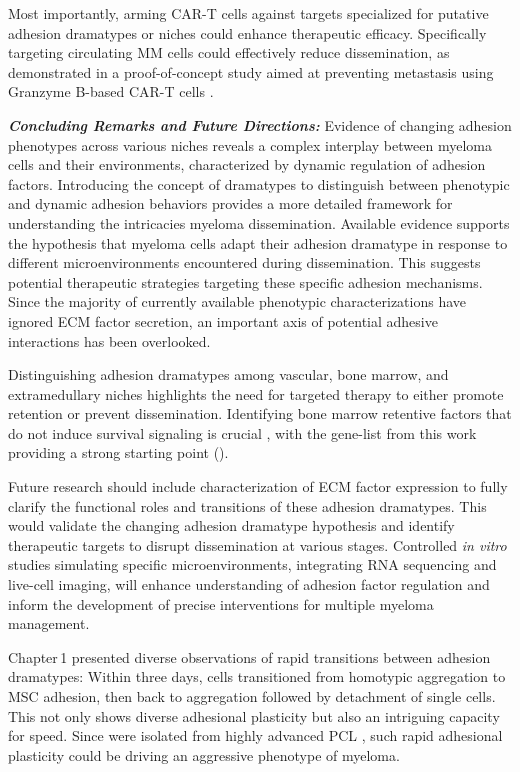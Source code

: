 Most importantly, arming CAR-T cells against targets specialized for putative
adhesion dramatypes or niches could enhance therapeutic efficacy. Specifically
targeting circulating MM cells could effectively reduce dissemination, as
demonstrated in a proof-of-concept study aimed at preventing metastasis using
Granzyme B-based CAR-T cells \cite{sunGranzymeBbasedCAR2024}.


\textbf{\textit{Concluding Remarks and Future Directions:}} Evidence of changing
adhesion phenotypes across various niches reveals a complex interplay between
myeloma cells and their environments, characterized by dynamic regulation of
adhesion factors. Introducing the concept of dramatypes to distinguish between
phenotypic and dynamic adhesion behaviors provides a more detailed framework for
understanding the intricacies myeloma dissemination. Available evidence supports
the hypothesis that myeloma cells adapt their adhesion dramatype in response to
different microenvironments encountered during dissemination. This suggests
potential therapeutic strategies targeting these specific adhesion mechanisms.
Since the majority of currently available phenotypic characterizations have
ignored \ac{ECM} factor secretion, an important axis of potential adhesive
interactions has been overlooked.

Distinguishing adhesion dramatypes among vascular, bone marrow, and
extramedullary niches highlights the need for targeted therapy to either promote
retention or prevent dissemination. Identifying bone marrow retentive factors
that do not induce survival signaling is crucial , with the gene-list from this work providing a strong starting point
().

Future research should include characterization of \ac{ECM} factor expression to
fully clarify the functional roles and transitions of these adhesion dramatypes.
This would validate the changing adhesion dramatype hypothesis and identify
therapeutic targets to disrupt dissemination at various stages. Controlled
\textit{in vitro} studies simulating specific microenvironments, integrating RNA
sequencing and live-cell imaging, will enhance understanding of adhesion factor
regulation and inform the development of precise interventions for multiple
myeloma management.



\unnsubsection{\cadplasticitytitle}%
\label{sec:discussion_caddadaptability}%
Chapter\,1 presented diverse observations of rapid transitions between adhesion
dramatypes: Within three days, \INA cells transitioned from homotypic
aggregation to \ac{MSC} adhesion, then back to aggregation followed by
detachment of single cells. This not only shows diverse adhesional
plasticity\footterm{\footadhesionplasticity}{\label{foot:adhesionplasticity}}
but also an intriguing capacity for speed. Since \INA were isolated from highly
advanced \ac{PCL} \cite{burgerGp130RasMediated2001}, such rapid adhesional
plasticity could be driving an aggressive phenotype of myeloma.



